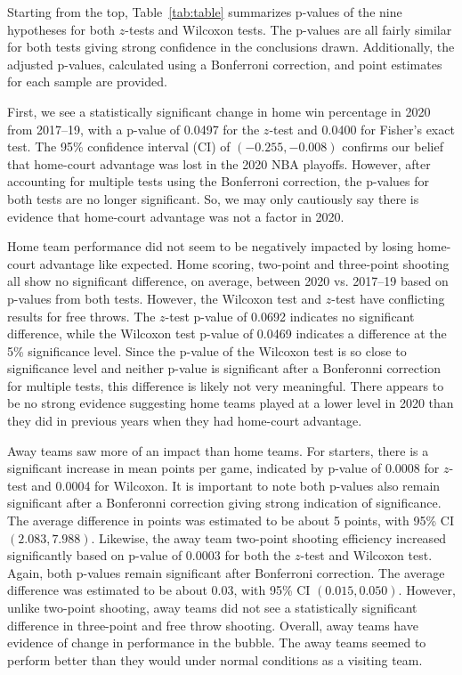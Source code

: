\documentclass[10pt]{article}
\begin{document}
Starting from the top,
Table~\ref{tab:table} summarizes p-values of the nine hypotheses for both
\(z\)-tests and Wilcoxon tests. The p-values are all fairly similar for both
tests giving strong confidence in the conclusions drawn. Additionally, the adjusted
p-values, calculated using a Bonferroni correction, and point estimates
for each sample are provided.

First, we see a statistically significant change
in home win percentage in 2020 from 2017--19, with a p-value of 0.0497 for the
\(z\)-test and 0.0400 for Fisher's exact test. The 95\% confidence
interval (CI) of \((-0.255, -0.008)\)
confirms our belief that home-court advantage was lost in the 2020 NBA 
playoffs. However, after accounting for
multiple tests using the Bonferroni correction, the p-values for both
tests are no longer significant. So, we may only cautiously say there is 
evidence that home-court advantage was
not a factor in 2020.

Home team performance did not seem to be negatively impacted by losing home-court
advantage like expected. Home scoring, two-point and three-point
shooting all show no significant difference, on average, between 2020 vs.
2017--19 based on p-values from both tests. However, the Wilcoxon test and \(z\)-test have conflicting results
for free throws. The \(z\)-test p-value of 0.0692 indicates no significant difference, while
the Wilcoxon test p-value of 0.0469 indicates a difference at the 5\% significance level. Since
the p-value of the Wilcoxon test is so close to significance level and neither p-value is significant
after a Bonferonni correction for multiple tests, this difference is likely not very meaningful.
There appears to be no strong evidence suggesting home teams played at
a lower level in 2020 than they did in previous years when they had home-court advantage.

Away teams saw more of an impact than home teams. For starters, there is a
significant increase in mean points per game, indicated by p-value of 0.0008 for \(z\)-test and
0.0004 for Wilcoxon. It is important to note both p-values also remain significant after
a Bonferonni correction giving strong indication of significance. The
average difference in points was estimated to
be about 5 points, with 95\% CI \((2.083, 7.988)\). Likewise, the away team two-point
shooting efficiency increased significantly based on p-value of 0.0003
for both the \(z\)-test and Wilcoxon test. Again, both p-values remain significant after Bonferroni correction.
The average difference was estimated to be about 0.03, with 95\% CI \((0.015, 0.050)\). However,
unlike two-point shooting, away teams did not see a statistically significant difference in three-point and free
throw shooting. Overall, away teams have evidence of change in performance in
the bubble. The away teams seemed to perform better than they would under normal
conditions as a visiting team.
\end{document}
